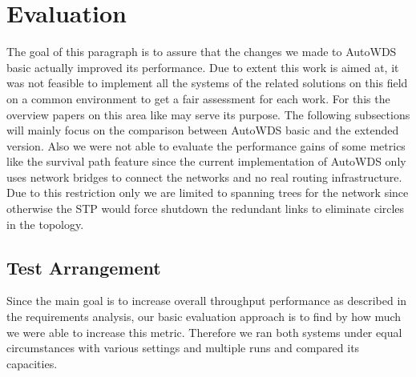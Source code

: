 \chapter{Evaluation}
The goal of this paragraph is to assure that the changes we made to AutoWDS basic actually improved its performance.
Due to extent this work is aimed at, it was not feasible to implement all the systems of the related solutions on this field on a common environment
to get a fair assessment for each work. For this the overview papers on this area like \cite{overview_caa} may serve its purpose.
The following subsections will mainly focus on the comparison between AutoWDS basic and the extended version. Also we were not able to evaluate the performance gains
of some metrics like the survival path feature since the current implementation of AutoWDS only uses network bridges to connect the networks and no real routing infrastructure.
Due to this restriction only we are limited to spanning trees for the network since otherwise the STP would force shutdown the redundant links to eliminate
circles in the topology.
\section{Test Arrangement}
Since the main goal is to increase overall throughput performance as described in the requirements analysis, our basic evaluation approach is
to find by how much we were able to increase this metric. Therefore we ran both systems under equal circumstances with various settings and multiple runs
and compared its capacities.
